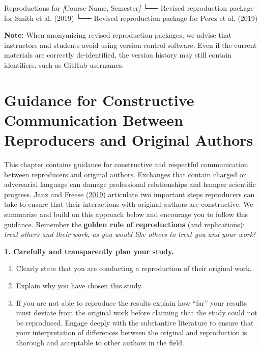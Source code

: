 \documentclass[
]{book}
\newenvironment{Shaded}{\begin{snugshade}}{\end{snugshade}}
\newcommand{\CommentTok}[1]{\textcolor[rgb]{0.56,0.35,0.01}{\textit{#1}}}
\newcommand{\NormalTok}[1]{#1}
\newcommand{\OtherTok}[1]{\textcolor[rgb]{0.56,0.35,0.01}{#1}}
\providecommand{\tightlist}{%
  \setlength{\itemsep}{0pt}\setlength{\parskip}{0pt}}
\begin{document}
\begin{Shaded}
\begin{Highlighting}[]
\NormalTok{  Reproductions for }\CommentTok{[}\OtherTok{Course Name, Semester}\CommentTok{]}
\NormalTok{    └── Revised reproduction package for Smith et al. (2019)}
\NormalTok{    └── Revised reproduction package for Perez et al. (2019)}
\end{Highlighting}
\end{Shaded}

\textbf{Note:} When anonymizing revised reproduction packages, we advise that instructors and students avoid using version control software. Even if the current materials are correctly de-identified, the version history may still contain identifiers, such as GitHub usernames.

\hypertarget{comunications}{%
\chapter{Guidance for Constructive Communication Between Reproducers and Original Authors}\label{comunications}}

This chapter contains guidance for constructive and respectful communication between reproducers and original authors. Exchanges that contain charged or adversarial language can damage professional relationships and hamper scientific progress. Janz and Freese (\href{https://www.mzes.uni-mannheim.de/openscience/wp-content/uploads/2019/01/Janz-Freese_-Good-and-Bad-Replications-1.pdf}{2019}) articulate two important steps reproducers can take to ensure that their interactions with original authors are constructive. We summarize and build on this approach below and encourage you to follow this guidance. Remember the \textbf{golden rule of reproductions} (and replications): \emph{treat others and their work, as you would like others to treat you and your work!}

\textbf{1. Carefully and transparently plan your study.}

\begin{enumerate}
\def\labelenumi{\alph{enumi}.}
\tightlist
\item
  Clearly state that you are conducting a reproduction of their original work.\\
\item
  Explain why you have chosen this study.
\item
  If you are not able to reproduce the results explain how ``far'' your results must deviate from the original work before claiming that the study could not be reproduced. Engage deeply with the substantive literature to ensure that your interpretation of differences between the original and reproduction is thorough and acceptable to other authors in the field.
\end{enumerate}
\end{document}
